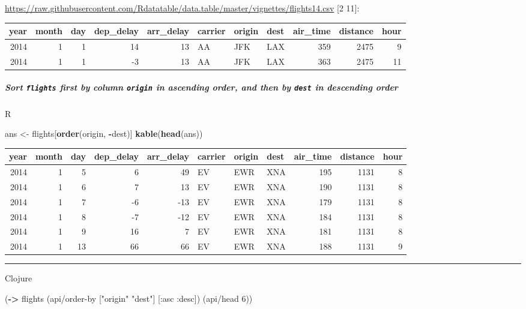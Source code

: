 \documentclass[]{article}
\newenvironment{Shaded}{\begin{snugshade}}{\end{snugshade}}
\newcommand{\KeywordTok}[1]{\textcolor[rgb]{0.13,0.29,0.53}{\textbf{#1}}}
\newcommand{\DecValTok}[1]{\textcolor[rgb]{0.00,0.00,0.81}{#1}}
\newcommand{\StringTok}[1]{\textcolor[rgb]{0.31,0.60,0.02}{#1}}
\newcommand{\OperatorTok}[1]{\textcolor[rgb]{0.81,0.36,0.00}{\textbf{#1}}}
\newcommand{\AttributeTok}[1]{\textcolor[rgb]{0.77,0.63,0.00}{#1}}
\newcommand{\NormalTok}[1]{#1}
\let\oldsubparagraph\subparagraph
\renewcommand{\subparagraph}[1]{\oldsubparagraph{#1}\mbox{}}
\begin{document}
\url{https://raw.githubusercontent.com/Rdatatable/data.table/master/vignettes/flights14.csv}
{[}2 11{]}:

\begin{longtable}[]{@{}rrrrrlllrrr@{}}
\toprule
year & month & day & dep\_delay & arr\_delay & carrier & origin & dest &
air\_time & distance & hour\tabularnewline
\midrule
\endhead
2014 & 1 & 1 & 14 & 13 & AA & JFK & LAX & 359 & 2475 & 9\tabularnewline
2014 & 1 & 1 & -3 & 13 & AA & JFK & LAX & 363 & 2475 & 11\tabularnewline
\bottomrule
\end{longtable}

\subparagraph{\texorpdfstring{Sort \texttt{flights} first by column
\texttt{origin} in ascending order, and then by \texttt{dest} in
descending
order}{Sort flights first by column origin in ascending order, and then by dest in descending order}}\label{sort-flights-first-by-column-origin-in-ascending-order-and-then-by-dest-in-descending-order}

R

\begin{Shaded}
\begin{Highlighting}[]
\NormalTok{ans <-}\StringTok{ }\NormalTok{flights[}\KeywordTok{order}\NormalTok{(origin, }\OperatorTok{-}\NormalTok{dest)]}
\KeywordTok{kable}\NormalTok{(}\KeywordTok{head}\NormalTok{(ans))}
\end{Highlighting}
\end{Shaded}

\begin{longtable}[]{@{}rrrrrlllrrr@{}}
\toprule
year & month & day & dep\_delay & arr\_delay & carrier & origin & dest &
air\_time & distance & hour\tabularnewline
\midrule
\endhead
2014 & 1 & 5 & 6 & 49 & EV & EWR & XNA & 195 & 1131 & 8\tabularnewline
2014 & 1 & 6 & 7 & 13 & EV & EWR & XNA & 190 & 1131 & 8\tabularnewline
2014 & 1 & 7 & -6 & -13 & EV & EWR & XNA & 179 & 1131 & 8\tabularnewline
2014 & 1 & 8 & -7 & -12 & EV & EWR & XNA & 184 & 1131 & 8\tabularnewline
2014 & 1 & 9 & 16 & 7 & EV & EWR & XNA & 181 & 1131 & 8\tabularnewline
2014 & 1 & 13 & 66 & 66 & EV & EWR & XNA & 188 & 1131 & 9\tabularnewline
\bottomrule
\end{longtable}

\begin{center}\rule{0.5\linewidth}{0.5pt}\end{center}

Clojure

\begin{Shaded}
\begin{Highlighting}[]
\NormalTok{(}\KeywordTok{->}\NormalTok{ flights}
\NormalTok{    (api/order-by [}\StringTok{"origin"} \StringTok{"dest"}\NormalTok{] [}\AttributeTok{:asc} \AttributeTok{:desc}\NormalTok{])}
\NormalTok{    (api/head }\DecValTok{6}\NormalTok{))}
\end{Highlighting}
\end{Shaded}
\end{document}
